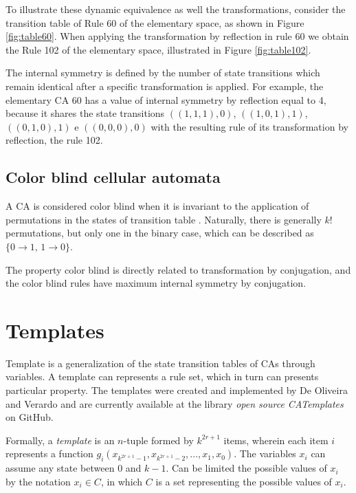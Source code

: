 \documentclass{llncs}
\begin{document}
To illustrate these dynamic equivalence as well the transformations, consider the transition table of Rule 60 of the elementary space, as shown in Figure \ref{fig:table60}. When applying the transformation by reflection in rule 60 we obtain the Rule 102 of the elementary space, illustrated in Figure \ref{fig:table102}.

The internal symmetry is defined by the number of state transitions which remain identical after a specific transformation is applied. For example, the elementary CA 60 has a value of internal symmetry by reflection equal to 4, because it shares the state transitions $((1,1,1),0)$, $((1,0,1),1)$, $((0,1,0),1)$ e $ ((0,0,0),0)$ with the resulting rule of its transformation by reflection, the rule 102.

\subsection{Color blind cellular automata}
A CA is considered color blind when it is invariant to the application of permutations in the states of transition table \cite{salo2013color}. Naturally, there is generally $k!$ permutations, but only one in the binary case, which can be described as $\{0 \to 1 ,\, 1 \to 0\}$. 

The property color blind is directly related to transformation by conjugation, and the color blind rules have maximum internal symmetry by conjugation.

\section{Templates}
\label{sec:templates}
Template is a generalization of the state transition tables of CAs through variables. A template can represents a rule set, which in turn can presents particular property. The templates were created and implemented by De Oliveira and Verardo \cite{deOliveira2014} and are currently available at the library \textit{open source CATemplates} \cite{CATemplates} on GitHub.

Formally, a \textit{template} is an $n$-tuple formed by $k^{2r+1}$ items, wherein each item $i$ represents a function $g_i(x_{k^{2r+1}-1},x_{k^{2r+1}-2},\dots,x_1,x_0)$. The variables $x_i$ can assume any state between 0 and $k-1$. Can be limited the possible values of $x_i$ by the notation $x_i \in C$, in which $C$ is a set representing the possible values of $x_i$. %
\end{document}
